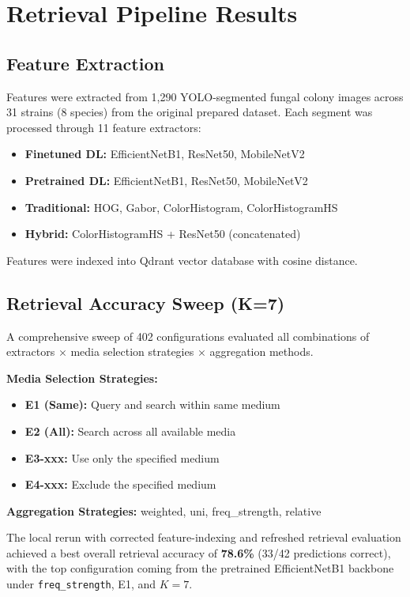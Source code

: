 \section{Retrieval Pipeline Results}

\subsection{Feature Extraction}
Features were extracted from 1,290 YOLO-segmented fungal colony images
across 31 strains (8 species) from the original prepared dataset. Each
segment was processed through 11 feature extractors:

\begin{itemize}[nosep]
  \item \textbf{Finetuned DL:} EfficientNetB1, ResNet50, MobileNetV2
  \item \textbf{Pretrained DL:} EfficientNetB1, ResNet50, MobileNetV2
  \item \textbf{Traditional:} HOG, Gabor, ColorHistogram, ColorHistogramHS
  \item \textbf{Hybrid:} ColorHistogramHS + ResNet50 (concatenated)
\end{itemize}

Features were indexed into Qdrant vector database with cosine distance.

\subsection{Retrieval Accuracy Sweep (K=7)}
A comprehensive sweep of 402 configurations evaluated all combinations of
extractors $\times$ media selection strategies $\times$ aggregation methods.

\textbf{Media Selection Strategies:}
\begin{itemize}[nosep]
  \item \textbf{E1 (Same):} Query and search within same medium
  \item \textbf{E2 (All):} Search across all available media
  \item \textbf{E3-xxx:} Use only the specified medium
  \item \textbf{E4-xxx:} Exclude the specified medium
\end{itemize}

\textbf{Aggregation Strategies:} weighted, uni, freq\_strength, relative

The local rerun with corrected feature-indexing and refreshed retrieval evaluation achieved a best overall retrieval accuracy of \textbf{78.6\%} (33/42 predictions correct), with the top configuration coming from the pretrained EfficientNetB1 backbone under \texttt{freq\_strength}, E1, and $K=7$.

